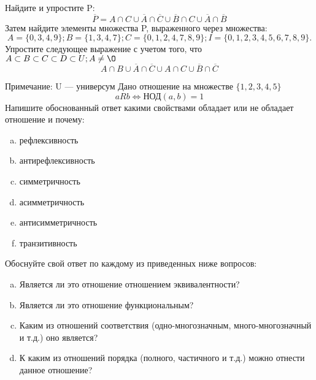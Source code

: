 \documentclass[10pt]{exam}
\begin{document}
\begin{questions}
\question
Найдите и упростите P:
\begin{equation*}
\overline{P} = A \cap C \cup \overline{A} \cap \overline{C} \cup \overline{B} \cap C \cup \overline{A} \cap \overline{B}
\end{equation*}
Затем найдите элементы множества P, выраженного через множества:
\begin{equation*}
A = \{0, 3, 4, 9\}; 
B = \{1, 3, 4, 7\};
C = \{0, 1, 2, 4, 7, 8, 9\};
I = \{0, 1, 2, 3, 4, 5, 6, 7, 8, 9\}.
\end{equation*}\question
Упростите следующее выражение с учетом того, что $A\subset B \subset C \subset D \subset U; A \neq \O$
\begin{equation*}
A \cap B \cup \overline{A} \cap \overline{C} \cup A \cap C \cup \overline{B} \cap \overline{C}
\end{equation*}

Примечание: U — универсум\question
Дано отношение на множестве $\{1, 2, 3, 4, 5\}$ 
\begin{equation*}
aRb \iff  \text{НОД}(a,b) =1
\end{equation*}
Напишите обоснованный ответ какими свойствами обладает или не обладает отношение и почему:   
\begin{enumerate} [a)]\setcounter{enumi}{0}
\item рефлексивность
\item антирефлексивность
\item симметричность
\item асимметричность
\item антисимметричность
\item транзитивность
\end{enumerate}

Обоснуйте свой ответ по каждому из приведенных ниже вопросов:
\begin{enumerate} [a)]\setcounter{enumi}{0}
    \item Является ли это отношение отношением эквивалентности?
    \item Является ли это отношение функциональным?
    \item Каким из отношений соответствия (одно-многозначным, много-многозначный и т.д.) оно является?
    \item К каким из отношений порядка (полного, частичного и т.д.) можно отнести данное отношение?
\end{enumerate}



\end{questions}
\end{document}
